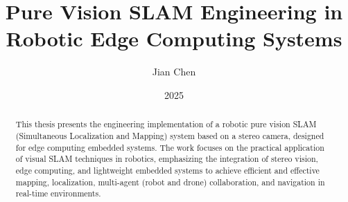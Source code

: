 \documentclass[MSc]{abdnthesis}
\title{Pure Vision SLAM Engineering in Robotic Edge Computing Systems}
\author{Jian Chen}
\date{2025}
\begin{document}

\maketitle
\makedeclaration


\begin{abstract}
  This thesis presents the engineering implementation of a robotic pure vision SLAM (Simultaneous Localization and Mapping) system based on a stereo camera, designed for edge computing embedded systems. The work focuses on the practical application of visual SLAM techniques in robotics, emphasizing the integration of stereo vision, edge computing, and lightweight embedded systems to achieve efficient and effective mapping, localization, multi-agent (robot and drone) collaboration, and navigation in real-time environments.
  

\end{abstract}
\end{document}

